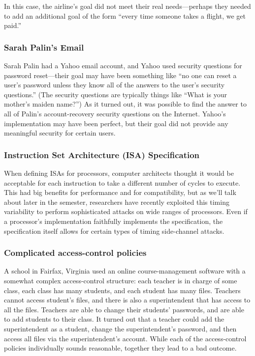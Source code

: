 In this case, the airline's goal did not meet
their real needs---perhaps they needed to add
an additional goal of the form ``every time someone takes a flight,
we get paid.''

\subsubsection{Sarah Palin's Email}
Sarah Palin had a Yahoo email account, and Yahoo
used security questions for password reset---their
goal may have been something like ``no one can
reset a user's password unless they know all of
the answers to the user's security questions.''
(The security questions are typically things like
``What is your mother's maiden name?'')
As it turned out, it was possible to find the answer
to all of Palin's account-recovery security questions 
on the Internet.\autocite{palin}
Yahoo's implementation may have been perfect, but their
goal did not provide any meaningful security for certain users.

\subsubsection{Instruction Set Architecture (ISA) Specification}
When defining ISAs for processors, computer architects
thought it would be acceptable for each instruction
to take a different number of cycles to execute.
This had big benefits for performance and for
compatibility, but as we'll talk about later in
the semester, researchers have recently exploited
this timing variability to perform sophisticated
attacks on wide ranges of processors.\autocite{hill:spectre-meltdown}
Even if a processor's implementation faithfully implements
the specification, the specification itself
allows for certain types of timing side-channel attacks.

\subsubsection{Complicated access-control policies}
A school in Fairfax, Virginia used an online
course-management software with a somewhat complex
access-control structure: each teacher is in charge of some
class, each class has many students, and each
student has many files. Teachers cannot access
student's files, and there is also
a superintendent that has access to all the files.
Teachers are able to change their students'
passwords, and are able to add students to their
class. It turned out that a teacher could add the
superintendent as a student, change the
superintendent's password, and then access all
files via the superintendent's account.
While each of the access-control policies individually
sounds reasonable, together they lead to a bad outcome.



